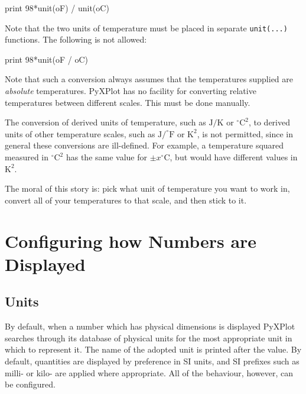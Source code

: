 \begin{dodo}
print 98*unit(oF) / unit(oC)
\end{dodo}

\noindent Note that the two units of temperature must be placed in separate
{\tt unit(...)} functions. The following is not allowed:

\begin{dontdo}
print 98*unit(oF / oC)
\end{dontdo}

Note that such a conversion always assumes that the temperatures supplied are
{\it absolute} temperatures. PyXPlot has no facility for converting relative
temperatures between different scales. This must be done manually.

The conversion of derived units of temperature, such as $\mathrm{J}/\mathrm{K}$ or
$^\circ\mathrm{C}^2$, to derived units of other temperature scales, such as
$\mathrm{J}/^\circ\mathrm{F}$ or $\mathrm{K}^2$, is not permitted, since in
general these conversions are ill-defined. For example, a temperature squared
measured in $^\circ\mathrm{C}^2$ has the same value for $\pm
x^\circ\mathrm{C}$, but would have different values in $\mathrm{K}^2$.

The moral of this story is: pick what unit of temperature you want to work in,
convert all of your temperatures to that scale, and then stick to it.


\section{Configuring how Numbers are Displayed}
\label{sec:unitdisp}

\subsection{Units}

By default, when a number which has physical dimensions is displayed PyXPlot
searches through its database of physical units for the most appropriate unit
in which to represent it. The name of the adopted unit is printed after the
value. By default, quantities are displayed by preference in SI units, and SI
prefixes such as milli- or kilo- are applied where appropriate. All of the
behaviour, however, can be configured.

